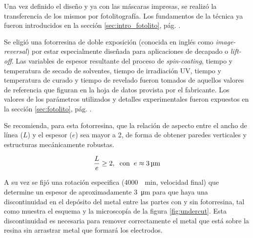  			 Una vez definido el diseño y ya con las máscaras impresas, se realizó la transferencia de los mismos por fotolitografía. Los fundamentos de la técnica ya fueron introducidos en la sección \ref{sec:intro_fotolito}, pág. \pageref{sec:intro_fotolito}.

 			 Se eligió una fotorresina de doble exposición (conocida en inglés como \textit{image-reversal}) por estar especialmente diseñada para aplicaciones de decapado o \textit{lift-off}. Las variables de espesor resultante del proceso de \textit{spin-coating}, tiempo y temperatura de secado de solventes, tiempo de irradiación UV, tiempo y temperatura de curado y tiempo de revelado fueron tomados de aquellos valores de referencia que figuran en la hoja de datos provista por el fabricante. \cite{TI35E} Los valores de los parámetros utilizados y detalles experimentales fueron expuestos en la sección \ref{sec:fotolito}, pág. \pageref{sec:fotolito}.

 			 Se recomienda, para esta fotorresina, que la relación de aspecto entre el ancho de línea ($L$) y el espesor ($e$) sea mayor a 2, de forma de obtener paredes verticales y estructuras mecánicamente robustas. 

 				\begin{equation}
				\frac{L}{e} \geq 2, \hspace*{0.2cm}\text{con}\hspace{0.2cm}  e \approx \SI{3}{\um}		
 				\end{equation}

     		 A su vez se fijó una rotación especifica (\SI{4000}{\per\minute}, velocidad final) que determine un espesor de aproximadamente \SI{3}{\um} para que haya una discontinuidad en el depósito del metal entre las partes con y sin fotorresina, tal como muestra el esquema y la microscopía de la figura \ref{fig:undercut}. Esta discontinuidad es necesaria para remover correctamente el metal que está sobre la resina sin arrastrar metal que formará los electrodos. 

